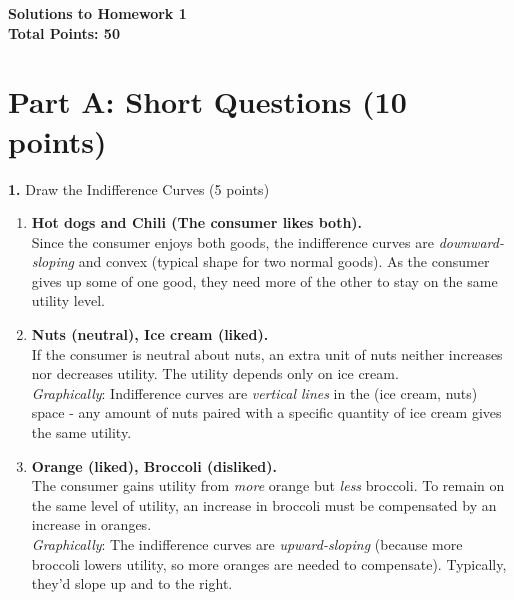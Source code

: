 \documentclass[12pt]{article}
\begin{document}
\begin{center}
    {\LARGE \textbf{Solutions to Homework 1}}\\[1em]
    \textbf{Total Points: 50}
\end{center}

\hrulefill

\section*{Part A: Short Questions (10 points)}

\textbf{1.} Draw the Indifference Curves (5 points)

\begin{enumerate}[label=(\alph*)]
    \item \textbf{Hot dogs and Chili (The consumer likes both).}\\
    Since the consumer enjoys both goods, the indifference curves are \emph{downward-sloping} and convex (typical shape for two normal goods). As the consumer gives up some of one good, they need more of the other to stay on the same utility level.

    \item \textbf{Nuts (neutral), Ice cream (liked).}\\
    If the consumer is neutral about nuts, an extra unit of nuts neither increases nor decreases utility. The utility depends only on ice cream. \\
    \textit{Graphically}: Indifference curves are \emph{vertical lines} in the (ice cream, nuts) space - any amount of nuts paired with a specific quantity of ice cream gives the same utility.

    \item \textbf{Orange (liked), Broccoli (disliked).}\\
    The consumer gains utility from \emph{more} orange but \emph{less} broccoli. To remain on the same level of utility, an increase in broccoli must be compensated by an increase in oranges. \\
    \textit{Graphically}: The indifference curves are \emph{upward-sloping} (because more broccoli lowers utility, so more oranges are needed to compensate). Typically, they'd slope up and to the right.
\end{enumerate}
\end{document}
